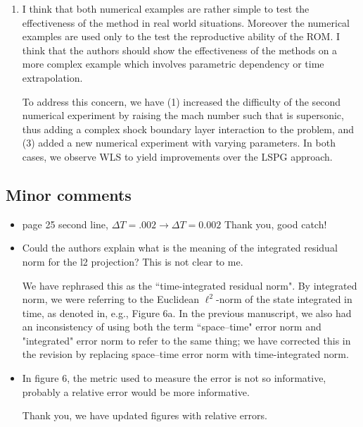 \documentclass[3p,computermodern,10pt]{elsarticle}
\begin{document}
\begin{enumerate}
\item I think that both numerical examples are rather simple to test the effectiveness of the method in real world situations. Moreover the numerical examples are used only to the test the reproductive ability of the ROM. I think that the authors should show the effectiveness of the methods on a more complex example which involves parametric dependency or time extrapolation.

{\color{red} To address this concern, we have (1) increased the difficulty of the second numerical experiment by raising the mach number such that is supersonic, thus adding a complex shock boundary layer interaction to the problem, and (3) added a new numerical experiment with varying parameters. In both cases, we observe WLS to yield improvements over the LSPG approach.}  

\end{enumerate}

\subsection{Minor comments}

\begin{itemize}
\item page 25 second line, $\Delta T = .002 \rightarrow  \Delta T = 0.002$
{\color{red} Thank you, good catch!}

\item Could the authors explain what is the meaning of the integrated residual norm for the l2
projection? This is not clear to me.

{\color{red} We have rephrased this as the ``time-integrated residual norm". By integrated norm, we were referring to the Euclidean $\ell^2$-norm of the state integrated in time, as denoted in, e.g., Figure 6a. In the previous manuscript, we also had an inconsistency of using both the term ``space--time" error norm and "integrated" error norm to refer to the same thing; we have corrected this in the revision by replacing space--time error norm with time-integrated norm.} 

\item In figure 6, the metric used to measure the error is not so informative, probably a relative error would be more informative.

{\color{red} Thank you, we have updated figures with relative errors.}
\end{itemize}
\end{document}
